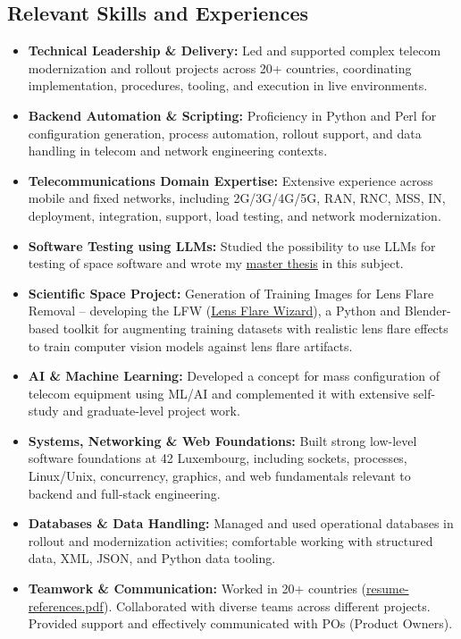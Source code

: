 \documentclass[a4paper,10pt]{article}
\begin{document}
\subsection*{Relevant Skills and Experiences}
\begin{itemize}
    \item \textbf{Technical Leadership \& Delivery:} Led and supported complex telecom modernization and rollout projects across 20+ countries, coordinating implementation, procedures, tooling, and execution in live environments.
    \item \textbf{Backend Automation \& Scripting:} Proficiency in Python and Perl for configuration generation, process automation, rollout support, and data handling in telecom and network engineering contexts.
    \item \textbf{Telecommunications Domain Expertise:} Extensive experience across mobile and fixed networks, including 2G/3G/4G/5G, RAN, RNC, MSS, IN, deployment, integration, support, load testing, and network modernization.
    \item \textbf{Software Testing using LLMs:} Studied the possibility to use LLMs for testing of space software and wrote my
    \href{https://gitlab.com/uniluxembourg/snt/svv/msc/nemet-attila-istvan-msc/thesis_work/-/blob/main/A.Nemet_Thesis_TMT__LLM.pdf}{ master thesis}
    in this subject.
    \item \textbf{Scientific Space Project:} Generation of Training Images for Lens Flare Removal -- developing the LFW (\href{https://github.com/dajcs/LFW}{Lens Flare Wizard}), a Python and Blender-based toolkit for augmenting training datasets with realistic lens flare effects to train computer vision models against lens flare artifacts.
    \item \textbf{AI \& Machine Learning:} Developed a concept for mass configuration of telecom equipment using ML/AI and complemented it with extensive self-study and graduate-level project work.
    \item \textbf{Systems, Networking \& Web Foundations:} Built strong low-level software foundations at 42 Luxembourg, including sockets, processes, Linux/Unix, concurrency, graphics, and web fundamentals relevant to backend and full-stack engineering.
    \item \textbf{Databases \& Data Handling:} Managed and used operational databases in rollout and modernization activities; comfortable working with structured data, XML, JSON, and Python data tooling.
    \item \textbf{Teamwork \& Communication:} Worked in 20+ countries
    (\href{gotoe:embedded=references/resume-references.pdf}{resume-references.pdf}).
    Collaborated with diverse teams across different projects. Provided support and effectively communicated with POs (Product Owners).
\end{itemize}
\end{document}
